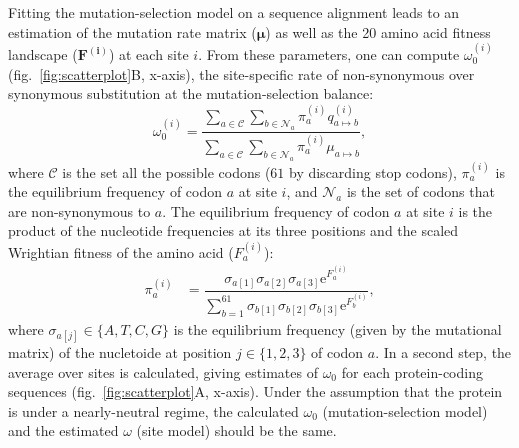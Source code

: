 \documentclass[9pt,twocolumn,twoside,lineno]{pnas-new}
\newcommand{\UniDimArray}[1]{\bm{#1}}
\newcommand{\e}{\mathrm{e}}
\begin{document}
{       Fitting the mutation-selection model on a sequence alignment leads to an estimation of the mutation rate matrix ($\UniDimArray{\mu}$) as well as the 20 amino acid fitness landscape ($\UniDimArray{F^{(i)}}$) at each site $i$.
       From these parameters, one can compute $\omega_{0}^{(i)}$ (fig.~\ref{fig:scatterplot}B, x-axis), the site-specific rate of non-synonymous over synonymous substitution at the mutation-selection balance:
       \begin{equation}
              \omega_{0}^{(i)} = \dfrac{\sum_{a \in \mathcal{C}} \sum_{b \in \mathcal{N}_a} \pi_a^{(i)} q_{a \mapsto b}^{(i)}}{\sum_{a \in \mathcal{C}} \sum_{b \in \mathcal{N}_a} \pi_a^{(i)} \mu_{a \mapsto b}},
       \end{equation}
       where $\mathcal{C}$ is the set all the possible codons ($61$ by discarding stop codons), $\pi_a^{(i)}$ is the equilibrium frequency of codon $a$ at site $i$, and $\mathcal{N}_a$ is the set of codons that are non-synonymous to $a$\cite{spielman_relationship_2015, rodrigue_detecting_2017}.
       The equilibrium frequency of codon $a$ at site $i$ is the product of the nucleotide frequencies at its three positions and the scaled Wrightian fitness of the amino acid ($F_a^{(i)}$):
       \begin{align}
              \pi_a^{(i)} & = \dfrac{ \sigma_{a[1]}\sigma_{a[2]}\sigma_{a[3]} \e^{F_a^{(i)}}}{\sum\limits_{b=1}^{61}\sigma_{b[1]}\sigma_{b[2]}\sigma_{b[3]} \e^{F_b^{(i)}} },
       \end{align}
       where $\sigma_{a[j]} \in \{A, T, C, G\}$ is the equilibrium frequency (given by the mutational matrix) of the nucletoide at position $j \in \{1, 2, 3\}$ of codon $a$.
       In a second step, the average over sites is calculated, giving estimates of $\omega_{0}$ for each protein-coding sequences (fig.~\ref{fig:scatterplot}A, x-axis).
       Under the assumption that the protein is under a nearly-neutral regime, the calculated $\omega_{0}$ (mutation-selection model) and the estimated $\omega$ (site model) should be the same\cite{spielman_relationship_2015}.

}
\end{document}
